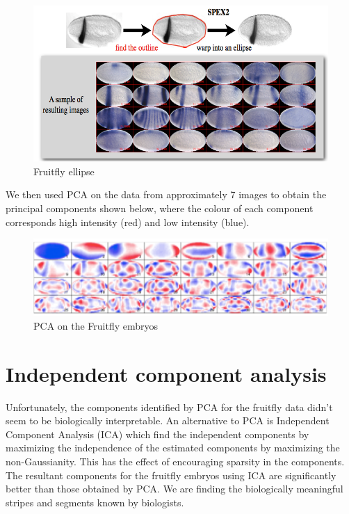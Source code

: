 \begin{figure}[H]
\begin{center}
\includegraphics[scale=0.5]{fruitfly_ellipse.png}
\end{center}
\caption{Fruitfly ellipse}
\label{fig:fruitfly_ellipse}
\end{figure}


We then used PCA on the data from approximately 7 images to obtain the principal components shown below, where the colour of each component corresponds high intensity (red) and low intensity (blue).

\begin{figure}[H]
\begin{center}
\includegraphics[scale=0.4]{pca_embryo.png}
\end{center}
\caption{PCA on the Fruitfly embryos}
\label{fig:fruitfly_pca}
\end{figure}




\section{Independent component analysis}
Unfortunately, the components identified by PCA for the fruitfly data didn't seem to be biologically interpretable. An alternative to PCA is Independent Component Analysis (ICA) which find the independent components by maximizing the independence of the estimated components by maximizing the non-Gaussianity. This has the effect of encouraging sparsity in the components. The resultant components for the fruitfly embryos using ICA are significantly better than those obtained by PCA. We are finding the biologically meaningful stripes and segments known by biologists.


